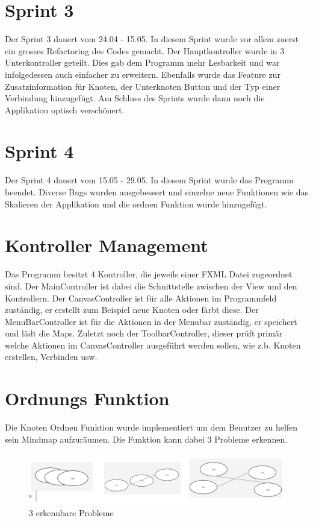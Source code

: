 \section{Sprint 3}
\label{sec:sprint_3}
Der Sprint 3 dauert vom 24.04 - 15.05. In diesem Sprint wurde vor allem zuerst ein grosses Refactoring des Codes gemacht. Der Hauptkontroller wurde in 3 Unterkontroller geteilt. Dies gab dem Programm mehr Lesbarkeit und war infolgedessen auch einfacher zu erweitern. Ebenfalls wurde das Feature zur Zusatzinformation für Knoten, der Unterknoten Button und der Typ einer Verbindung hinzugefügt. Am Schluss des Sprints wurde dann noch die Applikation optisch verschönert.
\section{Sprint 4}
\label{sec:sprint_4}
Der Sprint 4 dauert vom 15.05 - 29.05. In diesem Sprint wurde das Programm beendet. Diverse Bugs wurden ausgebessert und einzelne neue Funktionen wie das Skalieren der Applikation und die ordnen Funktion wurde hinzugefügt. 

\section{Kontroller Management}
\label{sec:controller_mgmnt}
Das Programm besitzt 4 Kontroller, die jeweils einer FXML Datei zugeordnet sind. Der MainController ist dabei die Schnittstelle zwischen der View und den Kontrollern. Der CanvasController ist für alle Aktionen im Programmfeld zuständig, er erstellt zum Beispiel neue Knoten oder färbt diese. Der MenuBarController ist für die Aktionen in der Menubar zuständig, er speichert und lädt die Maps. Zuletzt noch der ToolbarController, dieser prüft primär welche Aktionen im CanvasController ausgeführt werden sollen, wie z.b. Knoten erstellen, Verbinden usw.

\section{Ordnungs Funktion}
\label{sec:controller_mgmnt}
Die Knoten Ordnen Funktion wurde implementiert um dem Benutzer zu helfen sein Mindmap aufzuräumen.
Die Funktion kann dabei 3 Probleme erkennen. 
\begin{figure}[H]
	\centering
		\includegraphics[width=\textwidth]{images/threeissues.PNG}
	\caption{3 erkennbare Probleme}
	\label{fig:probleme}
\end{figure}

